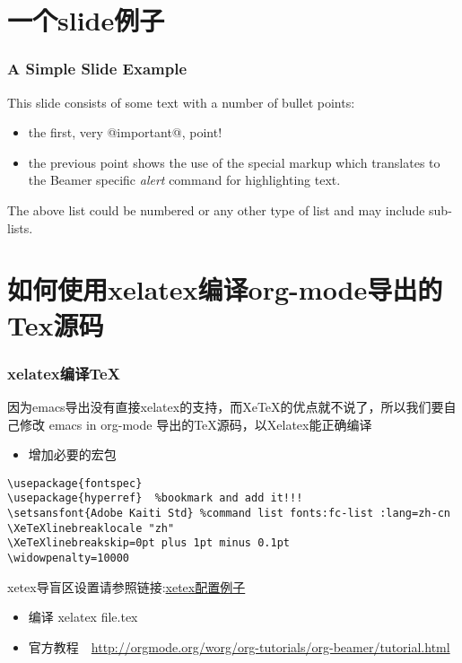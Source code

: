 \documentclass[bigger]{beamer}
\begin{document}
\section{一个slide例子}
\label{sec-3}
\begin{frame}
\frametitle{A Simple Slide Example}
\label{sec-3-1}

This slide consists of some text with a number of bullet points:

\begin{itemize}
\item the first, very @important@, point!
\item the previous point shows the use of the special markup which
  translates to the Beamer specific \emph{alert} command for highlighting
  text.
\end{itemize}


The above list could be numbered or any other type of list and may
include sub-lists.
\end{frame}
\section{如何使用xelatex编译org-mode导出的Tex源码}
\label{sec-4}
\begin{frame}[fragile]
\frametitle{xelatex编译\TeX{}}
\label{sec-4-1}

因为emacs导出没有直接xelatex的支持，而XeTeX的优点就不说了，所以我们要自己修改
emacs in org-mode 导出的\TeX{}源码，以Xelatex能正确编译
\begin{itemize}
\item 增加必要的宏包
\end{itemize}

\begin{verbatim}
\usepackage{fontspec}
\usepackage{hyperref}  %bookmark and add it!!!
\setsansfont{Adobe Kaiti Std} %command list fonts:fc-list :lang=zh-cn
\XeTeXlinebreaklocale "zh"
\XeTeXlinebreakskip=0pt plus 1pt minus 0.1pt
\widowpenalty=10000
\end{verbatim}


xetex导盲区设置请参照链接:\href{https://github.com/live5156go51/code/blob/master/Tex/moderncv/resume.tex}{xetex配置例子}
\begin{itemize}
\item 编译 xelatex file.tex
\item 官方教程　\href{http://orgmode.org/worg/org-tutorials/org-beamer/tutorial.html}{http://orgmode.org/worg/org-tutorials/org-beamer/tutorial.html}
\end{itemize}
\end{frame}
\end{document}
